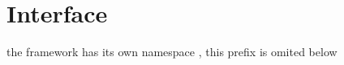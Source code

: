 \section{Interface}
\begin{itemize*}
	\item the framework has its own namespace , this prefix is omited below
\end{itemize*}







